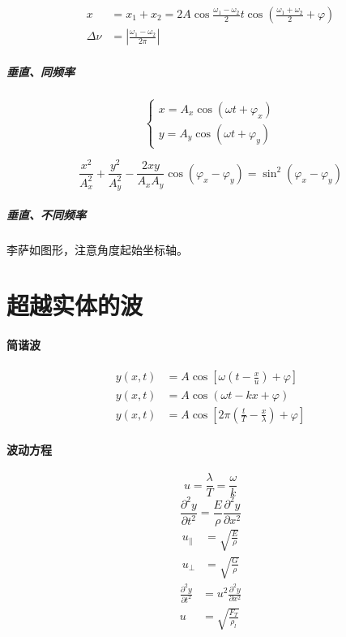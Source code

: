 \documentclass[12pt,a4paper]{article}
\numberwithin{equation}{section}
\begin{document}
\begin{CJK}{UTF8}{gbsn}
\begin{align}
  x&=x_1+x_2=2A\cos\frac{\omega_1-\omega_2}{2}t\cos\left(\frac{\omega_1+\omega_2}{2}+\varphi\right) \\
    \Delta\nu&=\left|\frac{\omega_1-\omega_2}{2\pi}\right|
\end{align}

\subparagraph{垂直、同频率}

 \begin{equation}
  \left\{
    \begin{array}{ll}
      x=A_x\cos(\omega t+\varphi_x) \\
      y=A_y\cos(\omega t+\varphi_y)
    \end{array}
  \right.
 \end{equation}


\begin{equation}
  \frac{x^2}{A_x^2}+\frac{y^2}{A_y^2}-\frac{2xy}{A_xA_y}\cos(\varphi_x-\varphi_y)=\sin^2(\varphi_x-\varphi_y)
\end{equation}

\subparagraph{垂直、不同频率\\}
李萨如图形，注意角度起始坐标轴。

\section{超越实体的波}


\paragraph{简谐波}
\begin{align}
  y(x,t)&= A\cos\left[ \omega\left(t-\frac{x}{u}\right)+\varphi \right] \\
  y(x,t)&= A\cos\left(\omega t-kx+\varphi \right) \\
 y(x,t)&= A\cos\left[2\pi \left(\frac{t}{T}-\frac{x}{\lambda}\right)+\varphi\right]
\end{align}

\paragraph{波动方程}
\begin{equation}
  u=\frac{\lambda}{T}=\frac{\omega}{k}
\end{equation}
\begin{equation}
  \frac{\partial^2y}{\partial t^2}=\frac{E}{\rho}\frac{\partial^2y}{\partial x^2}
\end{equation}
\begin{align}
  u_{\parallel}&=\sqrt{\frac{E}{\rho}} \\
  u_{\perp}&=\sqrt{\frac{G}{\rho}}
\end{align}
\begin{align}
  \frac{\partial^2y}{\partial t^2}&=u^2\frac{\partial^2y}{\partial x^2} \\
    u&=\sqrt{\frac{F_T}{\rho_l}}
\end{align}


\end{CJK}
\end{document}
